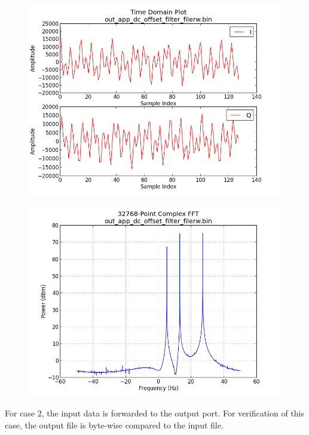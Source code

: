 \documentclass{article}
\begin{document}
\begin{figure}[ht]
	\centering
	\begin{minipage}{.5\textwidth}
		\centering\includegraphics[width=1.0\linewidth]{output_time_tones}
		\label{fig:out_time_tone}
	\end{minipage}%
	\begin{minipage}{.5\textwidth}
		\centering\includegraphics[width=1.0\linewidth]{output_freq_tones}
		\label{fig:out_freq_tone}
	\end{minipage}
\end{figure}
\noindent For case 2, the input data is forwarded to the output port. For verification of this case, the output file is byte-wise compared to the input file.
\end{document}
